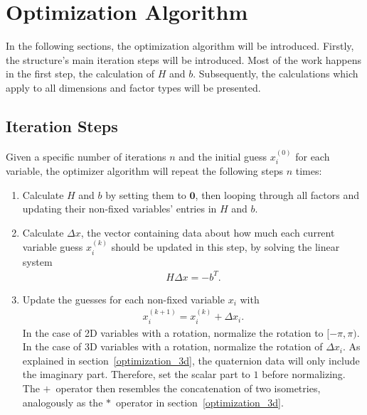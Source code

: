 \section{Optimization Algorithm}
In the following sections, the optimization algorithm will be introduced. Firstly, the structure's main iteration steps will be introduced. Most of the work happens in the first step, the calculation of $H$ and $b$. Subsequently, the calculations which apply to all dimensions and factor types will be presented.



\subsection{Iteration Steps}
\label{iter_steps}
Given a specific number of iterations $n$ and the initial guess $x_i^{(0)}$ for each variable, the optimizer algorithm will repeat the following steps $n$ times:
\begin{enumerate}
	\item Calculate $H$ and $b$ by setting them to $\boldsymbol{0}$, then looping through all factors and updating their non-fixed variables' entries in $H$ and $b$.
	\item Calculate $\Delta x$, the vector containing data about how much each current variable guess $x_i^{(k)}$ should be updated in this step, by solving the linear system
		\begin{align}
			H \Delta x = -b^T.
		\end{align}
	\item Update the guesses for each non-fixed variable $x_i$ with
		\begin{align}
			x_i^{(k+1)} = x_i^{(k)} + \Delta x_i.
		\end{align}
		In the case of 2D variables with a rotation, normalize the rotation to $[-\pi, \pi)$.
		In the case of 3D variables with a rotation, normalize the rotation of $\Delta x_i$. As explained in section~\ref{optimization_3d}, the quaternion data will only include the imaginary part. Therefore, set the scalar part to $1$ before normalizing. The $+$~operator then resembles the concatenation of two isometries, analogously as the $*$~operator in section~\ref{optimization_3d}.
\end{enumerate}



